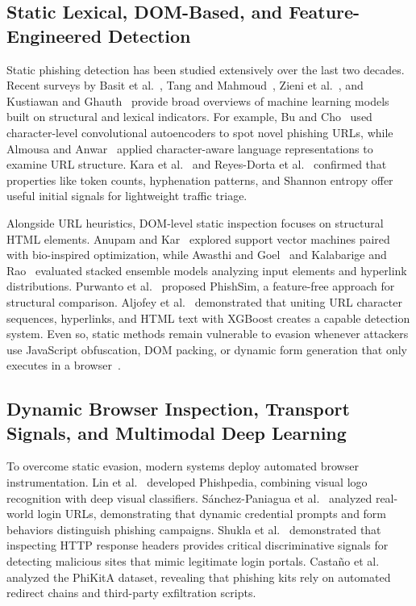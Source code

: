\documentclass[conference]{IEEEtran}
\begin{document}
\subsection{Static Lexical, DOM-Based, and Feature-Engineered Detection}\label{static-phishing-detection}

Static phishing detection has been studied extensively over the last two decades. Recent surveys by Basit et al.~\cite{basit2021}, Tang and Mahmoud~\cite{tang2021}, Zieni et al.~\cite{zienie2023}, and Kustiawan and Ghauth~\cite{kustiawan2025} provide broad overviews of machine learning models built on structural and lexical indicators. For example, Bu and Cho~\cite{bu2021} used character-level convolutional autoencoders to spot novel phishing URLs, while Almousa and Anwar~\cite{zhao2023} applied character-aware language representations to examine URL structure. Kara et al.~\cite{kara2022} and Reyes-Dorta et al.~\cite{reyes2024} confirmed that properties like token counts, hyphenation patterns, and Shannon entropy offer useful initial signals for lightweight traffic triage.

Alongside URL heuristics, DOM-level static inspection focuses on structural HTML elements. Anupam and Kar~\cite{anupam2021} explored support vector machines paired with bio-inspired optimization, while Awasthi and Goel~\cite{awasthi2022} and Kalabarige and Rao~\cite{kalabarige2022} evaluated stacked ensemble models analyzing input elements and hyperlink distributions. Purwanto et al.~\cite{purwanto2022} proposed PhishSim, a feature-free approach for structural comparison. Aljofey et al.~\cite{aljofey2022} demonstrated that uniting URL character sequences, hyperlinks, and HTML text with XGBoost creates a capable detection system. Even so, static methods remain vulnerable to evasion whenever attackers use JavaScript obfuscation, DOM packing, or dynamic form generation that only executes in a browser~\cite{lin2021,castano2023}.

\subsection{Dynamic Browser Inspection, Transport Signals, and Multimodal Deep Learning}\label{dynamic-detection}

To overcome static evasion, modern systems deploy automated browser instrumentation. Lin et al.~\cite{lin2021} developed Phishpedia, combining visual logo recognition with deep visual classifiers. S{\'a}nchez-Paniagua et al.~\cite{sanchez2022} analyzed real-world login URLs, demonstrating that dynamic credential prompts and form behaviors distinguish phishing campaigns. Shukla et al.~\cite{shukla2024} demonstrated that inspecting HTTP response headers provides critical discriminative signals for detecting malicious sites that mimic legitimate login portals. Casta{\~n}o et al.~\cite{castano2023} analyzed the PhiKitA dataset, revealing that phishing kits rely on automated redirect chains and third-party exfiltration scripts.
\end{document}
